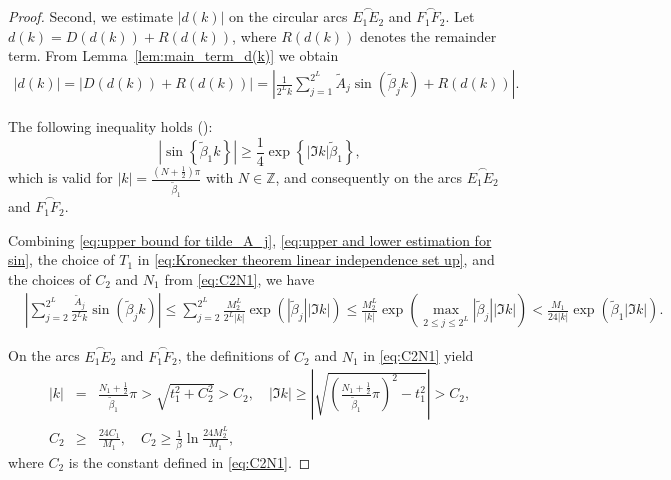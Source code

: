 \documentclass[11pt,reqno]{amsart}
\theoremstyle{definition}
\theoremstyle{remark}
\numberwithin{equation}{section}
\begin{document}
\begin{proof}
Second, we estimate $|d(k)|$ on the circular arcs $\stackrel{\frown}{E_1E_2}$ and $\stackrel{\frown}{F_1F_2}$. Let $d(k) = D(d(k)) + R(d(k))$, where $R(d(k))$ denotes the remainder term. From Lemma~\ref{lem:main_term_d(k)} we obtain
\begin{equation}\label{eq:expression of d(k) on arc independent}
	\begin{aligned}
		\left| d(k) \right|=\left| D(d(k))+R(d(k)) \right|=\left| \frac{1}{2^L k}\sum_{j=1}^{2^L}\tilde{A}_j \sin{\left(\tilde{\beta}_jk\right)}+R(d(k))\right|.
	\end{aligned}
\end{equation}

The following inequality holds (\cite{MP94}):
\begin{equation}\label{eq:estimation of sin on arc}
	\left|\sin\left\{\tilde{\beta}_1k\right\}\right| \geq \frac{1}{4} \exp\left\{|\Im k|\tilde{\beta}_1\right\},
\end{equation}
which is valid for \( |k| = \frac{(N + \frac{1}{2})\pi}{\tilde{\beta}_1} \) with \( N \in \mathbb{Z} \), and consequently on the arcs \(\stackrel{\frown}{E_1E_2}\) and \(\stackrel{\frown}{F_1 F_2}\).

Combining \eqref{eq:upper bound for tilde_A_j}, \eqref{eq:upper and lower estimation for sin}, the choice of $T_1$ in \eqref{eq:Kronecker theorem linear independence set up}, and the choices of $C_2$ and $N_1$ from \eqref{eq:C2N1}, we have
\begin{equation}\label{eq:estimation of part of main term independent case}
  \begin{aligned}
   &\left| \sum_{j=2}^{2^L}\frac{\tilde{A}_j}{2^L k}\sin{\left(\tilde{\beta}_j k\right)} \right|\leq\sum_{j=2}^{2^L}\frac{M_2^L}{2^L |k|}\exp{\left(\left|\tilde{\beta}_j\right||\Im k|\right)}\leq \frac{M_2^L}{|k|}\exp{\left(\max_{2\leq j\leq 2^L}\left|\tilde{\beta}_j\right||\Im k|\right)}<\frac{M_1}{24|k|}\exp{\left(\tilde{\beta}_1 |\Im k|\right)}.~
  \end{aligned}
\end{equation}

On the arcs $\overset{\frown}{E_1E_2}$ and $\overset{\frown}{F_1F_2}$, the definitions of $C_2$ and $N_1$ in \eqref{eq:C2N1} yield
\begin{eqnarray}\label{eq:k and C0 and Im k on arc}
|k|&=&\frac{N_1+\frac{1}{2}}{\tilde{\beta}_1}\pi>\sqrt{t_1^2+C_2^2}>C_2,  \quad |\Im k|\geq \left| \sqrt{\left(\frac{N_1+\frac{1}{2}}{\tilde{\beta}_1}\pi\right)^2-t_1^2}\right|>C_2,    \nonumber\\
C_2 &\geq & \frac{24C_1}{M_1}, \quad C_2\geq \frac{1}{\beta}\ln{\frac{24M_2^L}{M_1}},
\end{eqnarray}
where $C_2$ is the constant defined in \eqref{eq:C2N1}.


\end{proof}
\end{document}
